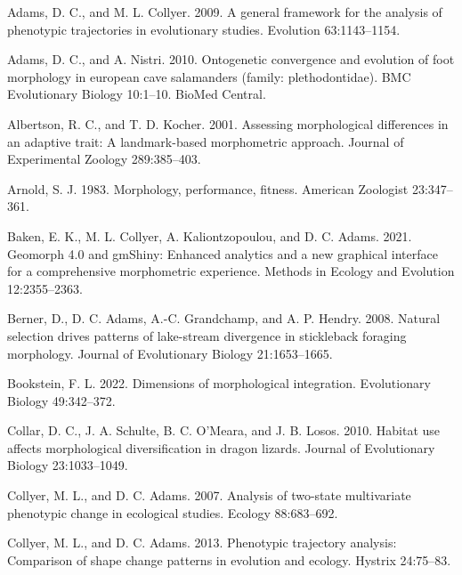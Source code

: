 \documentclass[
  11pt,
]{article}
\newlength{\cslhangindent}
\newlength{\cslentryspacingunit} %
\newenvironment{CSLReferences}[2] %
 {%
  \setlength{\parindent}{0pt}
  \ifodd #1
  \let\oldpar\par
  \def\par{\hangindent=\cslhangindent\oldpar}
  \fi
  \setlength{\parskip}{#2\cslentryspacingunit}
 }%
 {}
\begin{document}
\hypertarget{refs}{}
\begin{CSLReferences}{1}{0}
\leavevmode{}%
Adams, D. C., and M. L. Collyer. 2009. A general framework for the
analysis of phenotypic trajectories in evolutionary studies. Evolution
63:1143--1154.

\leavevmode{}%
Adams, D. C., and A. Nistri. 2010. Ontogenetic convergence and evolution
of foot morphology in european cave salamanders (family:
plethodontidae). BMC Evolutionary Biology 10:1--10. BioMed Central.

\leavevmode{}%
Albertson, R. C., and T. D. Kocher. 2001. Assessing morphological
differences in an adaptive trait: A landmark-based morphometric
approach. Journal of Experimental Zoology 289:385--403.

\leavevmode{}%
Arnold, S. J. 1983. Morphology, performance, fitness. American Zoologist
23:347--361.

\leavevmode{}%
Baken, E. K., M. L. Collyer, A. Kaliontzopoulou, and D. C. Adams. 2021.
Geomorph 4.0 and gmShiny: Enhanced analytics and a new graphical
interface for a comprehensive morphometric experience. Methods in
Ecology and Evolution 12:2355--2363.

\leavevmode{}%
Berner, D., D. C. Adams, A.-C. Grandchamp, and A. P. Hendry. 2008.
Natural selection drives patterns of lake-stream divergence in
stickleback foraging morphology. Journal of Evolutionary Biology
21:1653--1665.

\leavevmode{}%
Bookstein, F. L. 2022. Dimensions of morphological integration.
Evolutionary Biology 49:342--372.

\leavevmode{}%
Collar, D. C., J. A. Schulte, B. C. O'Meara, and J. B. Losos. 2010.
Habitat use affects morphological diversification in dragon lizards.
Journal of Evolutionary Biology 23:1033--1049.

\leavevmode{}%
Collyer, M. L., and D. C. Adams. 2007. Analysis of two-state
multivariate phenotypic change in ecological studies. Ecology
88:683--692.

\leavevmode{}%
Collyer, M. L., and D. C. Adams. 2013. Phenotypic trajectory analysis:
Comparison of shape change patterns in evolution and ecology. Hystrix
24:75--83.


\end{CSLReferences}
\end{document}
